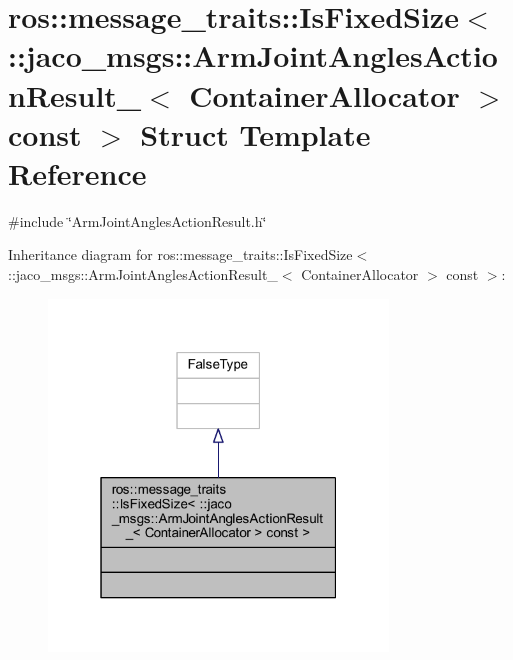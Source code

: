 \hypertarget{structros_1_1message__traits_1_1IsFixedSize_3_01_1_1jaco__msgs_1_1ArmJointAnglesActionResult___3bf1df1374d517dec039dc4942b1afdab}{}\section{ros\+:\+:message\+\_\+traits\+:\+:Is\+Fixed\+Size$<$ \+:\+:jaco\+\_\+msgs\+:\+:Arm\+Joint\+Angles\+Action\+Result\+\_\+$<$ Container\+Allocator $>$ const $>$ Struct Template Reference}
\label{structros_1_1message__traits_1_1IsFixedSize_3_01_1_1jaco__msgs_1_1ArmJointAnglesActionResult___3bf1df1374d517dec039dc4942b1afdab}


{\ttfamily \#include \char`\"{}Arm\+Joint\+Angles\+Action\+Result.\+h\char`\"{}}



Inheritance diagram for ros\+:\+:message\+\_\+traits\+:\+:Is\+Fixed\+Size$<$ \+:\+:jaco\+\_\+msgs\+:\+:Arm\+Joint\+Angles\+Action\+Result\+\_\+$<$ Container\+Allocator $>$ const $>$\+:
\nopagebreak
\begin{figure}[H]
\begin{center}
\leavevmode
\includegraphics[width=256pt]{df/db7/structros_1_1message__traits_1_1IsFixedSize_3_01_1_1jaco__msgs_1_1ArmJointAnglesActionResult___3147d321b5763e24056927d7045e45b12}
\end{center}
\end{figure}


